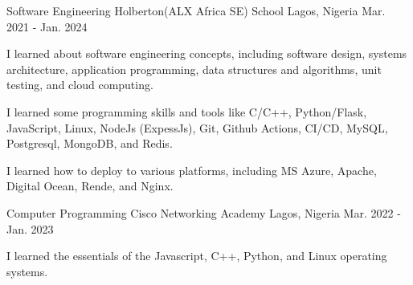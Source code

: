 

\begin{cventries}

  \cventry
    {Software Engineering} %
    {Holberton(ALX Africa SE) School} %
    {Lagos, Nigeria} %
    {Mar. 2021 - Jan. 2024} %
    {
      \begin{cvitems} %
        \item {I learned about software engineering concepts, including software design, systems architecture, application programming, data structures and algorithms, unit testing, and cloud computing.}
        \item {I learned some programming skills and tools like C/C++, Python/Flask, JavaScript, Linux, NodeJs (ExpessJs), Git, Github Actions, CI/CD, MySQL, Postgresql, MongoDB, and Redis.}
        \item {I learned how to deploy to various platforms, including MS Azure, Apache, Digital Ocean, Rende, and Nginx.}
      \end{cvitems}
    }

  \cventry
    {Computer Programming} %
    {Cisco Networking Academy} %
    {Lagos, Nigeria} %
    {Mar. 2022 - Jan. 2023} %
    {
      \begin{cvitems} %
        \item {I learned the essentials of the Javascript, C++, Python, and Linux operating systems.}
      \end{cvitems}
    }

\end{cventries}
